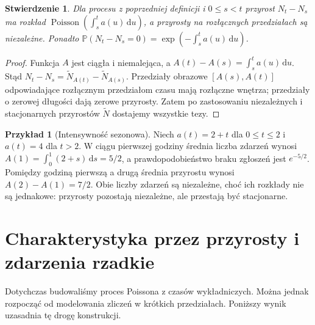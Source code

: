 \documentclass[11pt,a4paper,oneside]{report}
\numberwithin{equation}{chapter}
\theoremstyle{plain}
\newtheorem{stwierdzenie}[twierdzenie]{Stwierdzenie}
\theoremstyle{definition}
\newtheorem{przyklad}{Przykład}[chapter]
\theoremstyle{remark}
\newcommand{\Prob}{\mathbb{P}}
\newcommand{\dd}{\mathrm{d}}
\begin{document}
\begin{stwierdzenie}
Dla procesu z poprzedniej definicji i $0\le s<t$ przyrost
$N_t-N_s$ ma rozkład
$\operatorname{Poisson}(\int_s^t a(u)\,\dd u)$, a przyrosty
na rozłącznych przedziałach są niezależne. Ponadto
$\Prob(N_t-N_s=0)=\exp(-\int_s^t a(u)\,\dd u)$.
\end{stwierdzenie}
\begin{proof}
Funkcja $A$ jest ciągła i niemalejąca, a
$A(t)-A(s)=\int_s^t a(u)\,\dd u$.
Stąd $N_t-N_s=\widetilde N_{A(t)}-\widetilde N_{A(s)}$.
Przedziały obrazowe $[A(s),A(t)]$ odpowiadające rozłącznym
przedziałom czasu mają rozłączne wnętrza; przedziały o
zerowej długości dają zerowe przyrosty. Zatem po zastosowaniu
niezależnych i stacjonarnych przyrostów $\widetilde N$
dostajemy wszystkie tezy.
\end{proof}

\begin{przyklad}[Intensywność sezonowa]
Niech $a(t)=2+t$ dla $0\le t\le2$ i $a(t)=4$ dla $t>2$.
W ciągu pierwszej godziny średnia liczba zdarzeń wynosi
$A(1)=\int_0^1(2+s)\,\dd s=5/2$,
a prawdopodobieństwo braku zgłoszeń jest $e^{-5/2}$.
Pomiędzy godziną pierwszą a drugą średnia przyrostu
wynosi $A(2)-A(1)=7/2$. Obie liczby zdarzeń są niezależne,
choć ich rozkłady nie są jednakowe: przyrosty pozostają
niezależne, ale przestają być stacjonarne.
\end{przyklad}

\section{Charakterystyka przez przyrosty i zdarzenia rzadkie}
Dotychczas budowaliśmy proces Poissona z czasów wykładniczych.
Można jednak rozpocząć od modelowania zliczeń w krótkich
przedziałach. Poniższy wynik uzasadnia tę drogę konstrukcji.
\end{document}
